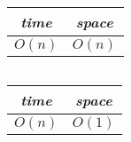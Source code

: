 \begin{frame}
  \begin{columns}
      
  \end{columns}

  \pause
  \vspace{0.80cm}
  \begin{table}[H]
    \centering
    \begin{tabular}{c|c}
      {\it time} & {\it space} \\ \hline
      $O(n)$     & $O(n)$      
    \end{tabular}
  \end{table}
\end{frame}

\begin{frame}
  \begin{columns}
      
  \end{columns}

  \pause
  \vspace{0.80cm}
  \begin{table}[H]
    \centering
    \begin{tabular}{c|c}
      {\it time} & {\it space} \\ \hline
      $O(n)$     & $O(1)$      
    \end{tabular}
  \end{table}
\end{frame}


